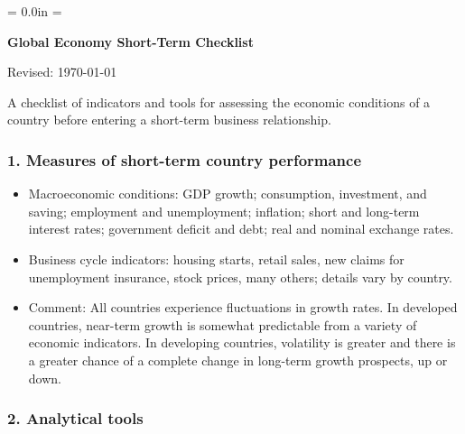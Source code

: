 \documentclass[letterpaper,12pt]{article}
\renewcommand{\labelitemi}{$\Box$}
\def\HeadName{Global Economy Short-Term Checklist}
\begin{document}
\parindent = 0.0in
\parskip = \bigskipamount
\thispagestyle{empty}%
\Head

\centerline{\large \bf \HeadName}%
\centerline{Revised:  \today}

\bigskip
A checklist of indicators and tools for assessing the economic conditions of a country before entering a short-term business relationship.


\subsubsection*{1. Measures of short-term country performance}

\renewcommand{\labelitemi}{$\Box$}
\begin{itemize}

\item Macroeconomic conditions:  GDP growth; consumption, investment, and saving; employment and unemployment; inflation; short and long-term interest rates; government deficit and debt; real and nominal exchange rates.

\item Business cycle indicators:  housing starts, retail sales,
    new claims for unemployment insurance, stock prices, many others;
    details vary by country.

\item Comment:  All countries experience fluctuations in growth rates.
    In developed countries, near-term growth is somewhat predictable
    from a variety of economic indicators.
    In developing countries, volatility is greater and there is a greater
    chance of a complete change in long-term growth prospects, up or down.
\end{itemize}


\subsubsection*{2. Analytical tools}
\end{document}
